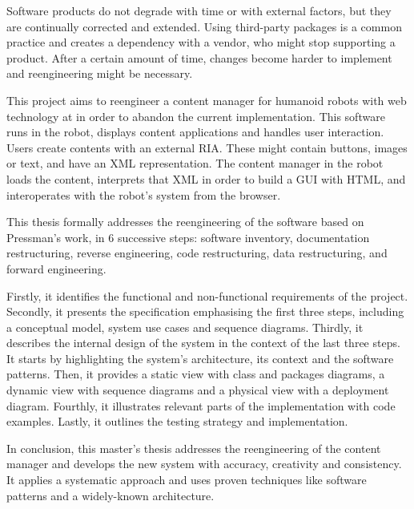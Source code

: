 % 
% 
%

Software products do not degrade with time or with external factors, but they are continually corrected and extended.
Using third-party packages is a common practice and creates a dependency with a vendor, who might stop supporting a product.
After a certain amount of time, changes become harder to implement and reengineering might be necessary.


This project aims to reengineer a content manager for humanoid robots with web technology at \company in order to abandon the current \flash implementation.
This software runs in the robot, displays content applications and handles user interaction.
Users create contents with an external \acs{RIA}. 
These might contain buttons, images or text, and have an \acs{XML} representation.
The content manager in the robot loads the content, interprets that \acs{XML} in order to build a \acs{GUI} with \acs{HTML}, and interoperates with the robot's system from the browser.

This thesis formally addresses the reengineering of the software based on Pressman's work, in 6 successive steps: software inventory, documentation restructuring, reverse engineering, code restructuring, data restructuring, and forward engineering.

Firstly, it identifies the functional and non-functional requirements of the project.
Secondly, it presents the specification emphasising the first three steps, including a conceptual model, system use cases and sequence diagrams.
Thirdly, it describes the internal design of the system in the context of the last three steps.
It starts by highlighting the system's architecture, its context and the software patterns.
Then, it provides a static view with class and packages diagrams, a dynamic view with sequence diagrams and a physical view with a deployment diagram.
Fourthly, it illustrates relevant parts of the implementation with code examples.
Lastly, it outlines the testing strategy and implementation.

In conclusion, this master's thesis addresses the reengineering of the content manager and develops the new system with accuracy, creativity and consistency. 
It applies a systematic approach and uses proven techniques like software patterns and a widely-known architecture.

